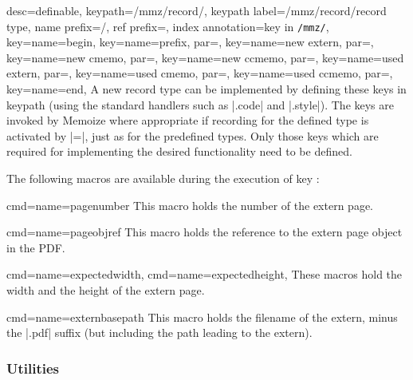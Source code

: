 \documentclass[a4paper,11pt]{article}
\begin{document}
\begin{doc}{
    desc=definable,
    keypath=/mmz/record/,
    keypath label=/mmz/record/record type,
    name prefix={/}, ref prefix=,
    index annotation={key in \texttt{/mmz/}},
    key={name=begin},
    key={name=prefix, par=},
    key={name=new extern, par=},
    key={name=new cmemo, par=},
    key={name=new ccmemo, par=},
    key={name=used extern, par=},
    key={name=used cmemo, par=},
    key={name=used ccmemo, par=},
    key={name=end},
  }
  A new record type can be implemented by defining these keys in keypath
   (using the standard  handlers such as |.code| and
  |.style|).  The keys are invoked by Memoize where appropriate if recording
  for the defined type is activated by |=|,
  just as for the predefined types.  Only those keys which are required for
  implementing the desired functionality need to be defined.

  The following macros are available during the execution of key
  :
  \begin{doc}{cmd={name=pagenumber}}
    This macro holds the number of the extern page.
  \end{doc}
  \begin{doc}{cmd={name=pageobjref}}
    This macro holds the reference to the extern page object in the PDF.
  \end{doc}
  \begin{doc}{
      cmd={name=expectedwidth},
      cmd={name=expectedheight},
    }
    These macros hold the width and the height of the extern page.
  \end{doc}
  \begin{doc}{cmd={name=externbasepath}}
    This macro holds the filename of the extern, minus the |.pdf| suffix (but
    including the path leading to the extern).
  \end{doc}
\end{doc}


\subsubsection{Utilities}
\label{sec:ref:memoize-utils}
\end{document}
